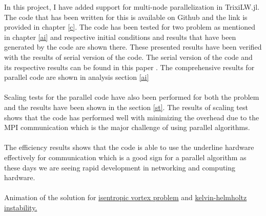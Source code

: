 In this project, I have added support for multi-node parallelization in {\ttfamily TrixiLW.jl}. The code that has been written for this is available on Github and the link is provided in chapter \ref{c}. The code has been tested for two problem as mentioned in chapter \ref{ai} and respective initial conditions and results that have been generated by the code are shown there. These presented results have been verified with the results of serial version of the code. The serial version of the code and its respective results can be found in this paper \cite{arpit}. The comprehensive results for parallel code are shown in analysis section \ref{ai} \\ \\
Scaling tests for the parallel code have also been performed for both the problem and the results have been shown in the section \ref{st}. The results of scaling test shows that the code has performed well with minimizing the overhead due to the MPI communication which is the major challenge of using parallel algorithms. \\ \\
The efficiency results shows that the code is able to use the underline hardware effectively for communication which is a good sign for a parallel algorithm as these days we are seeing rapid development in networking and computing hardware.\\ \\
Animation of the solution for \href{https://youtu.be/Q1fwe4AS2fk}{isentropic vortex problem} and \href{https://youtu.be/06WHI8WRZzM}{kelvin-helmholtz instability.}